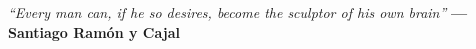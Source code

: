 \pagestyle{empty} %


\vspace*{\fill}
\begin{center}
    \begin{minipage}{.8\textwidth}
        \centering
        \textit{``Every man can, if he so desires, become the sculptor of his own brain''}
        \vspace{10pt}
        \textbf{--- Santiago Ramón y Cajal}
    \end{minipage}
\end{center}
\vspace*{\fill}